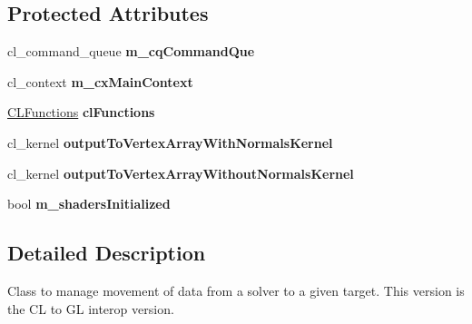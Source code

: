 \subsection*{Protected Attributes}
\begin{DoxyCompactItemize}
\item 
\hypertarget{classbt_soft_body_solver_output_c_lto_g_l_a2056c3ef5cf8b8aa511dae3f1edd6cb3}{cl\+\_\+command\+\_\+queue {\bfseries m\+\_\+cq\+Command\+Que}}\label{classbt_soft_body_solver_output_c_lto_g_l_a2056c3ef5cf8b8aa511dae3f1edd6cb3}

\item 
\hypertarget{classbt_soft_body_solver_output_c_lto_g_l_a4ad5da5de4efd90a262d050b806ca513}{cl\+\_\+context {\bfseries m\+\_\+cx\+Main\+Context}}\label{classbt_soft_body_solver_output_c_lto_g_l_a4ad5da5de4efd90a262d050b806ca513}

\item 
\hypertarget{classbt_soft_body_solver_output_c_lto_g_l_ab27a637e6a862d6631c14708e973b7b7}{\hyperlink{class_c_l_functions}{C\+L\+Functions} {\bfseries cl\+Functions}}\label{classbt_soft_body_solver_output_c_lto_g_l_ab27a637e6a862d6631c14708e973b7b7}

\item 
\hypertarget{classbt_soft_body_solver_output_c_lto_g_l_a92e45d1faba046fff346f3be0201fc5c}{cl\+\_\+kernel {\bfseries output\+To\+Vertex\+Array\+With\+Normals\+Kernel}}\label{classbt_soft_body_solver_output_c_lto_g_l_a92e45d1faba046fff346f3be0201fc5c}

\item 
\hypertarget{classbt_soft_body_solver_output_c_lto_g_l_a8ff0a3f5498fe35986145a58a199af78}{cl\+\_\+kernel {\bfseries output\+To\+Vertex\+Array\+Without\+Normals\+Kernel}}\label{classbt_soft_body_solver_output_c_lto_g_l_a8ff0a3f5498fe35986145a58a199af78}

\item 
\hypertarget{classbt_soft_body_solver_output_c_lto_g_l_ac66f59814bbba6c16f8b147bf934c930}{bool {\bfseries m\+\_\+shaders\+Initialized}}\label{classbt_soft_body_solver_output_c_lto_g_l_ac66f59814bbba6c16f8b147bf934c930}

\end{DoxyCompactItemize}


\subsection{Detailed Description}
Class to manage movement of data from a solver to a given target. This version is the C\+L to G\+L interop version. 

